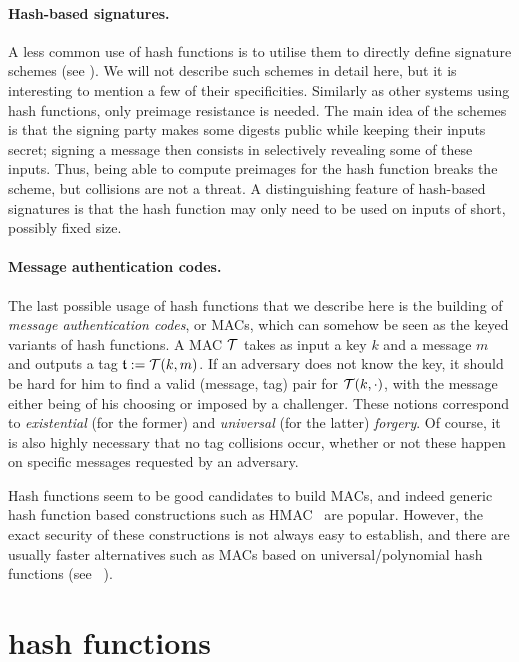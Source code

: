 \paragraph{Hash-based signatures.} A less common use of hash functions is to utilise them to directly define signature schemes (see \eg \cite{DBLP:conf/crypto/Merkle87}). We will not describe such schemes in detail
here, but it is interesting to mention a few of their specificities. Similarly as other systems using hash functions, only preimage resistance is needed. The main
idea of the schemes is that the signing party makes some digests public while keeping their inputs secret; signing a message then consists in selectively revealing some of
these inputs. Thus, being able to compute preimages for the hash function breaks the scheme, but collisions are not a threat.
A distinguishing feature of hash-based signatures is that the hash function may only need to be used on inputs of short, possibly fixed size. 

\paragraph{Message authentication codes.} The last possible usage of hash functions that we describe here is the building of \emph{message authentication codes}, or MACs, which
can somehow be seen as the keyed variants of hash functions. A MAC $\operatorname{\mathcal{T}}$ takes as input a key $k$ and a message $m$ and outputs a tag $\mathfrak{t} := \operatorname{\mathcal{T}}(k, m)$.
If an adversary does not know the key, it should be hard for him to find a valid (message, tag) pair for $\operatorname{\mathcal{T}}(k, \cdot)$, with the message either being of his choosing
or imposed by a challenger. These notions correspond to \emph{existential} (for the former) and \emph{universal} (for the latter) \emph{forgery}. Of course, it is also
highly necessary that no tag collisions occur, whether or not these happen on specific messages requested by an adversary.

Hash functions seem to be good candidates to build MACs, and indeed generic hash function based constructions such as HMAC~\cite{DBLP:conf/crypto/BellareCK96} are popular. However, the exact security of
these constructions is not always easy to establish, and there are usually faster alternatives such as MACs based on universal/polynomial hash functions (see \eg~\cite{DBLP:conf/crypto/BlackHKKR99}).

\section{\merkdam hash functions}
\label{sec:mdhf}

